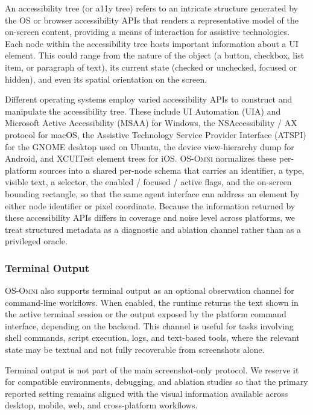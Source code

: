 An accessibility tree (or a11y tree) refers to an intricate structure generated by the OS or browser accessibility APIs that renders a representative model of the on-screen content, providing a means of interaction for assistive technologies. Each node within the accessibility tree hosts important information about a UI element. This could range from the nature of the object (a button, checkbox, list item, or paragraph of text), its current state (checked or unchecked, focused or hidden), and even its spatial orientation on the screen.

Different operating systems employ varied accessibility APIs to construct and manipulate the accessibility tree. These include UI Automation (UIA) and Microsoft Active Accessibility (MSAA) for Windows, the NSAccessibility / AX protocol for macOS, the Assistive Technology Service Provider Interface (ATSPI) for the GNOME desktop used on Ubuntu, the device view-hierarchy dump for Android, and XCUITest element trees for iOS. \textsc{OS-Omni} normalizes these per-platform sources into a shared per-node schema that carries an identifier, a type, visible text, a selector, the enabled / focused / active flags, and the on-screen bounding rectangle, so that the same agent interface can address an element by either node identifier or pixel coordinate. Because the information returned by these accessibility APIs differs in coverage and noise level across platforms, we treat structured metadata as a diagnostic and ablation channel rather than as a privileged oracle.

 
\subsubsection{Terminal Output}
\label{app:osomni_terminal}

\textsc{OS-Omni} also supports terminal output as an optional observation channel for command-line workflows. When enabled, the runtime returns the text shown in the active terminal session or the output exposed by the platform command interface, depending on the backend. This channel is useful for tasks involving shell commands, script execution, logs, and text-based tools, where the relevant state may be textual and not fully recoverable from screenshots alone.

Terminal output is not part of the main screenshot-only protocol. We reserve it for compatible environments, debugging, and ablation studies so that the primary reported setting remains aligned with the visual information available across desktop, mobile, web, and cross-platform workflows.

